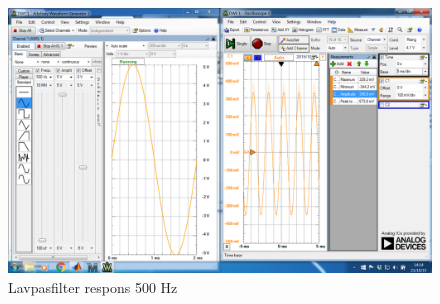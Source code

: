 \begin{figure}[H]
	\centering
	\includegraphics[width=1\textwidth]{Figurer/Lavpasfilter_Praktisk_500Hz}
	\caption{Lavpasfilter respons 500 Hz}
	\label{fig:Filter}
\end{figure}


